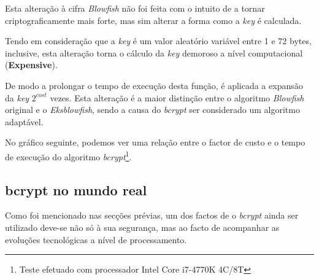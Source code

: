 Esta alteração à cifra \emph{Blowfish} não foi feita com o intuito de a tornar criptograficamente mais forte, mas sim alterar a forma como a \emph{key} é calculada.

Tendo em consideração que a \emph{key} é um valor aleatório variável entre 1 e 72 bytes, inclusive, esta alteração torna o cálculo da \emph{key} demoroso a nível computacional (\textbf{Expensive}).

De modo a prolongar o tempo de execução desta função, é aplicada a expansão da \emph{key} $2^{cost}$ vezes. Esta alteração é a maior distinção entre o algoritmo \emph{Blowfish} original e o \emph{Eksblowfish}, sendo a causa do \emph{bcrypt} ser considerado um algoritmo adaptável.

\newpage
No gráfico seguinte, podemos ver uma relação entre o factor de custo e o tempo de execução do algoritmo \emph{bcrypt}\footnote{Teste efetuado com processador Intel Core i7-4770K 4C/8T}.

\begin{center}
\end{center}

\subsection{bcrypt no mundo real}

Como foi mencionado nas secções prévias, um dos factos de o \emph{bcrypt} ainda ser utilizado deve-se não só à sua segurança, mas ao facto de acompanhar as evoluções tecnológicas a nível de processamento.

